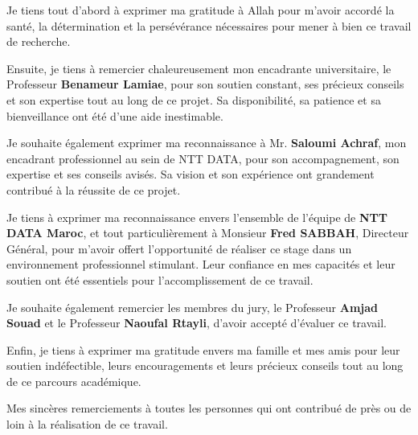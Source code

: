 \documentclass[12pt, a4paper, openany]{report}
\begin{document}
\begin{large}
\itshape
\setlength{\parskip}{0.3cm} %
\renewcommand{\baselinestretch}{1.3}\selectfont %

Je tiens tout d'abord à exprimer ma gratitude à Allah pour m'avoir accordé la santé, la détermination et la persévérance nécessaires pour mener à bien ce travail de recherche.

Ensuite, je tiens à remercier chaleureusement mon encadrante universitaire, le Professeur \textbf{Benameur Lamiae}, pour son soutien constant, ses précieux conseils et son expertise tout au long de ce projet. Sa disponibilité, sa patience et sa bienveillance ont été d'une aide inestimable.

Je souhaite également exprimer ma reconnaissance à Mr. \textbf{Saloumi Achraf}, mon encadrant professionnel au sein de NTT DATA, pour son accompagnement, son expertise et ses conseils avisés. Sa vision et son expérience ont grandement contribué à la réussite de ce projet.

Je tiens à exprimer ma reconnaissance envers l'ensemble de l'équipe de \textbf{NTT DATA Maroc}, et tout particulièrement à Monsieur \textbf{Fred SABBAH}, Directeur Général, pour m'avoir offert l'opportunité de réaliser ce stage dans un environnement professionnel stimulant. Leur confiance en mes capacités et leur soutien ont été essentiels pour l'accomplissement de ce travail.

Je souhaite également remercier les membres du jury, le Professeur \textbf{Amjad Souad} et le Professeur \textbf{Naoufal Rtayli}, d'avoir accepté d'évaluer ce travail.

Enfin, je tiens à exprimer ma gratitude envers ma famille et mes amis pour leur soutien indéfectible, leurs encouragements et leurs précieux conseils tout au long de ce parcours académique.

Mes sincères remerciements à toutes les personnes qui ont contribué de près ou de loin à la réalisation de ce travail.

\end{large}

\vspace{0.6cm}

\vspace{0.1cm}


\newpage
\thispagestyle{frontmatter} %
\end{document}
